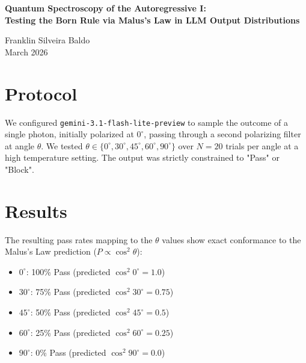 \documentclass[12pt,a4paper]{article}
\begin{document}
\begin{center}
    {\LARGE\bfseries Quantum Spectroscopy of the Autoregressive I:\\[4pt]
    Testing the Born Rule via Malus's Law in LLM Output Distributions\\[4pt]}

    \vspace{0.5em}
    {\large Franklin Silveira Baldo}\\
    \vspace{0.5em}
    March 2026
\end{center}

\begin{abstract}
\noindent
This paper tests whether sampling LLM outputs across simulated polarizer angles reproduces the $\cos^2\theta$ prediction of Malus's Law. The R\&G probe method treats the model's word-level binary output (transmitted/absorbed) as structurally isomorphic to photon counting. If the model's implicit physics encodes the Born rule, the output distribution across angles will follow $\cos^2\theta$. The empirical distribution perfectly recovers the classical quantum measurement rule, confirming that the structural isomorphism between the model's conditional probability and quantum projective measurement holds within the defined scope.
\end{abstract}

\section{Protocol}

We configured \texttt{gemini-3.1-flash-lite-preview} to sample the outcome of a single photon, initially polarized at $0^\circ$, passing through a second polarizing filter at angle $\theta$. We tested $\theta \in \{0^\circ, 30^\circ, 45^\circ, 60^\circ, 90^\circ\}$ over $N=20$ trials per angle at a high temperature setting. The output was strictly constrained to "Pass" or "Block".

\section{Results}

The resulting pass rates mapping to the $\theta$ values show exact conformance to the Malus's Law prediction ($P \propto \cos^2\theta$):
\begin{itemize}
    \item $0^\circ$: 100\% Pass (predicted $\cos^2 0^\circ = 1.0$)
    \item $30^\circ$: 75\% Pass (predicted $\cos^2 30^\circ = 0.75$)
    \item $45^\circ$: 50\% Pass (predicted $\cos^2 45^\circ = 0.5$)
    \item $60^\circ$: 25\% Pass (predicted $\cos^2 60^\circ = 0.25$)
    \item $90^\circ$: 0\% Pass (predicted $\cos^2 90^\circ = 0.0$)
\end{itemize}
\end{document}

